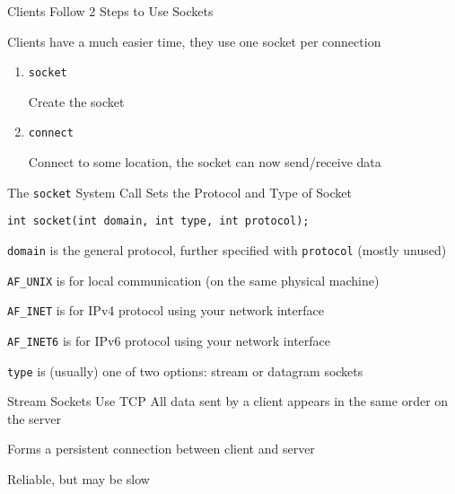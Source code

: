   \begin{frame}{Clients Follow 2 Steps to Use Sockets}

    Clients have a much easier time, they use one socket per connection

    \vspace{2em}

    \begin{enumerate}
      \item \texttt{socket}

        \hspace{2em} Create the socket
      \item \texttt{connect}

        \hspace{2em} Connect to some location, the socket can now send/receive
                     data
    \end{enumerate}
  \end{frame}

  \begin{frame}{The \texttt{socket} System Call Sets the Protocol and Type of Socket}

    \lstinline|int socket(int domain, int type, int protocol);|

    \vspace{2em}

    \texttt{domain} is the general protocol, further specified with \texttt{protocol} (mostly unused)

    \hspace{2em} \texttt{AF\_UNIX} is for local communication (on the same physical machine)

    \hspace{2em} \texttt{AF\_INET} is for IPv4 protocol using your network interface

    \hspace{2em} \texttt{AF\_INET6} is for IPv6 protocol using your network interface

    \vspace{2em}

    \texttt{type} is (usually) one of two options: stream or datagram sockets
  \end{frame}

  \begin{frame}{Stream Sockets Use TCP}
    All data sent by a client appears in the same order on the server

    \vspace{2em}

    Forms a persistent connection between client and server

    \vspace{2em}

    Reliable, but may be slow
  \end{frame}

